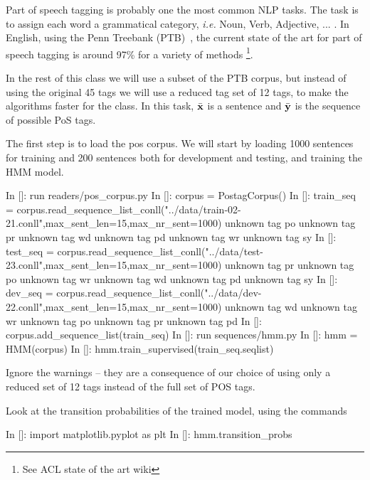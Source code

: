 Part of speech tagging is probably one the most common NLP tasks. The
task is to assign each word a grammatical category, \emph{i.e.} Noun,
Verb, Adjective, ... . In English, using the Penn Treebank (PTB)~\citep{pennTreeBank}, the current
state of the art for part of speech tagging is around 97\% for a
variety of methods \footnote{See ACL state of the art wiki}.

In the rest of this class we will use a subset of the PTB corpus, but
instead of using the original 45 tags we will use a reduced tag set of
12 tags, to make the algorithms faster for the
class. In this task, $\bar{\mathbf{x}}$ is a sentence and $\bar{\mathbf{y}}$
is the sequence of possible PoS tags.

The first step is to load the pos corpus. We will start by loading
1000 sentences for training and 200 sentences both for development and
testing, and training the HMM model.
\begin{python}
In []: run readers/pos_corpus.py
In []: corpus = PostagCorpus()
In []: train_seq = corpus.read_sequence_list_conll("../data/train-02-21.conll",max_sent_len=15,max_nr_sent=1000)
unknown tag po
unknown tag pr
unknown tag wd
unknown tag pd
unknown tag wr
unknown tag sy
In []: test_seq = corpus.read_sequence_list_conll("../data/test-23.conll",max_sent_len=15,max_nr_sent=1000)
unknown tag pr
unknown tag po
unknown tag wr
unknown tag wd
unknown tag pd
unknown tag sy
In []: dev_seq = corpus.read_sequence_list_conll("../data/dev-22.conll",max_sent_len=15,max_nr_sent=1000)
unknown tag wd
unknown tag wr
unknown tag po
unknown tag pr
unknown tag pd
In []: corpus.add_sequence_list(train_seq) 
In []: run sequences/hmm.py
In []: hmm = HMM(corpus)
In []: hmm.train_supervised(train_seq.seqlist)
\end{python}

Ignore the warnings -- they are a consequence of our choice of using only a reduced set of 12 tags instead of the full set of POS tags.


Look at the transition probabilities of the trained model, using the commands
\begin{python}
In []: import matplotlib.pyplot as plt
In []: hmm.transition_probs
\end{python}

